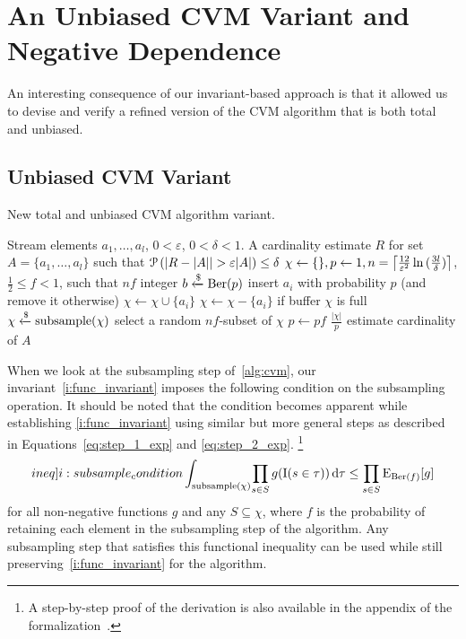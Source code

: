 \section{An Unbiased CVM Variant and Negative Dependence\label{sec:negdep}}

An interesting consequence of our invariant-based approach is that it allowed us to devise and verify a refined version of the CVM algorithm that is both total and unbiased.

\subsection{Unbiased CVM Variant}

\begin{algorithm}[t!]
	\caption{New total and unbiased CVM algorithm variant.}\label{alg:cvm_new}
	\begin{algorithmic}[1]
  \Require Stream elements $a_1,\dots,a_l$, $0 < \varepsilon$, $0 < \delta < 1$.
  \Ensure A cardinality estimate $R$ for set $A = \{ a_1,\dots,a_l \}$ such that $\prob \left( |R - |A| | > \varepsilon |A| \right) \leq \delta$
  \State $\chi \gets \{\}, p \gets 1, n = \ceil*{\frac{12}{\varepsilon^2} \ln{(\frac{3l}{\delta})} }$, $\frac{1}{2} \leq f < 1$, such that $nf$ integer
    \State $b \getsr \Ber(p)$ \Comment insert $a_i$ with probability $p$ (and remove it otherwise)
      \State $\chi \gets \chi \cup \{a_i\}$
    \Else
      \State $\chi \gets \chi - \{a_i\}$
    \EndIf
     \Comment if buffer $\chi$ is full
      \State $\chi \getsr \mathrm{subsample}(\chi)$ \Comment select a random $nf$-subset of $\chi$
      \State $p \gets pf$
    \EndIf
  \EndFor
  \State \Return $\frac{|\chi|}{p}$ \Comment estimate cardinality of $A$
  \end{algorithmic}
\end{algorithm}%

When we look at the subsampling step of~\cref{alg:cvm}, our invariant~\cref{i:func_invariant} imposes the following condition on the subsampling operation.
It should be noted that the condition becomes apparent while establishing \cref{i:func_invariant} using similar but more general steps as described in Equations~\ref{eq:step_1_exp} and \ref{eq:step_2_exp}.%
\footnote{A step-by-step proof of the derivation is also available in the appendix of the formalization~\cite[Appendix~A]{CVM_Distinct_Elements-AFP}.}
\begin{equation}\label[ineq]{i:subsample_condition}
  \integral{\mathrm{subsample}(\chi)}{\prod_{s \in S} g(\indicat(s \in \tau))}{\tau} \leq \prod_{s \in S} \expect_{\Ber(f)} [g]
\end{equation}
for all non-negative functions $g$ and any $S \subseteq \chi$, where $f$ is the probability of retaining each element in the subsampling step of the algorithm.
Any subsampling step that satisfies this functional inequality can be used while still preserving~\cref{i:func_invariant} for the algorithm.

